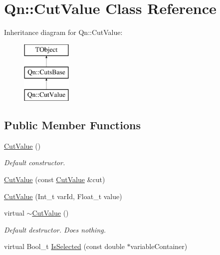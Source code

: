 \hypertarget{classQn_1_1CutValue}{}\section{Qn\+:\+:Cut\+Value Class Reference}
\label{classQn_1_1CutValue}
Inheritance diagram for Qn\+:\+:Cut\+Value\+:\begin{figure}[H]
\begin{center}
\leavevmode
\includegraphics[height=3.000000cm]{classQn_1_1CutValue}
\end{center}
\end{figure}
\subsection*{Public Member Functions}
\begin{DoxyCompactItemize}
\item 
\mbox{\label{classQn_1_1CutValue_ab516a2ca2aa3f9242ccc5c85644f18d9}} 
\mbox{\hyperlink{classQn_1_1CutValue_ab516a2ca2aa3f9242ccc5c85644f18d9}{Cut\+Value}} ()
\begin{DoxyCompactList}\small\item\em Default constructor. \end{DoxyCompactList}\item 
\mbox{\hyperlink{classQn_1_1CutValue_af631798a1a977d81ff8fdb37bcb6abd4}{Cut\+Value}} (const \mbox{\hyperlink{classQn_1_1CutValue}{Cut\+Value}} \&cut)
\item 
\mbox{\hyperlink{classQn_1_1CutValue_a85b618f1f7f26f786311a964bc1509e8}{Cut\+Value}} (Int\+\_\+t var\+Id, Float\+\_\+t value)
\item 
\mbox{\label{classQn_1_1CutValue_ac38331929f308d7e04a81239234638e5}} 
virtual \mbox{\hyperlink{classQn_1_1CutValue_ac38331929f308d7e04a81239234638e5}{$\sim$\+Cut\+Value}} ()
\begin{DoxyCompactList}\small\item\em Default destructor. Does nothing. \end{DoxyCompactList}\item 
virtual Bool\+\_\+t \mbox{\hyperlink{classQn_1_1CutValue_acdfa89e7784423f4beaea51deafd424f}{Is\+Selected}} (const double $\ast$variable\+Container)
\end{DoxyCompactItemize}
